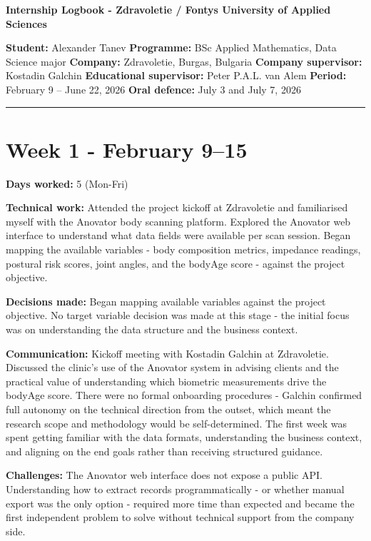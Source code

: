\documentclass[11pt,a4paper]{article}
\begin{document}
{\LARGE\bfseries Internship Logbook  -  Zdravoletie / Fontys University of Applied Sciences\par}
\medskip

\textbf{Student:} Alexander Tanev
\textbf{Programme:} BSc Applied Mathematics, Data Science major
\textbf{Company:} Zdravoletie, Burgas, Bulgaria
\textbf{Company supervisor:} Kostadin Galchin
\textbf{Educational supervisor:} Peter P.A.L. van Alem
\textbf{Period:} February 9 – June 22, 2026
\textbf{Oral defence:} July 3 and July 7, 2026

\noindent\rule{\textwidth}{0.4pt}


\section{Week 1  -  February 9–15}

\textbf{Days worked:} 5 (Mon-Fri)

\textbf{Technical work:} Attended the project kickoff at Zdravoletie and familiarised myself with the Anovator body scanning platform. Explored the Anovator web interface to understand what data fields were available per scan session. Began mapping the available variables  -  body composition metrics, impedance readings, postural risk scores, joint angles, and the bodyAge score  -  against the project objective.

\textbf{Decisions made:} Began mapping available variables against the project objective. No target variable decision was made at this stage  -  the initial focus was on understanding the data structure and the business context.

\textbf{Communication:} Kickoff meeting with Kostadin Galchin at Zdravoletie. Discussed the clinic's use of the Anovator system in advising clients and the practical value of understanding which biometric measurements drive the bodyAge score. There were no formal onboarding procedures  -  Galchin confirmed full autonomy on the technical direction from the outset, which meant the research scope and methodology would be self-determined. The first week was spent getting familiar with the data formats, understanding the business context, and aligning on the end goals rather than receiving structured guidance.

\textbf{Challenges:} The Anovator web interface does not expose a public API. Understanding how to extract records programmatically  -  or whether manual export was the only option  -  required more time than expected and became the first independent problem to solve without technical support from the company side.
\end{document}
